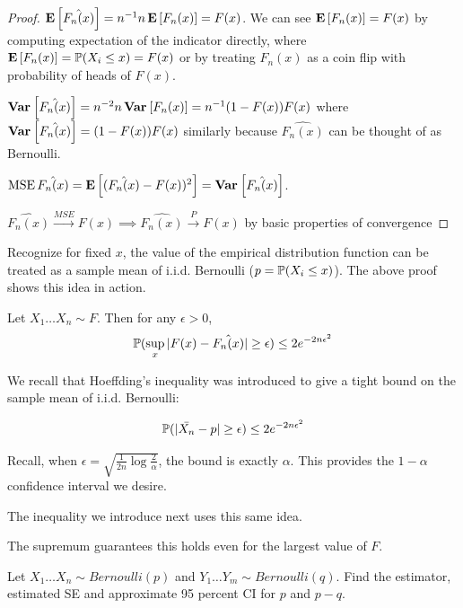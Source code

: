 \documentclass[10pt]{article}
\begin{document}
\begin{proof}
    $\E{\hat{F_n(x)}} = n^{-1}n\E{F_n(x)} = F(x)$. We can see $\E{F_n(x)} =
    F(x)$ by computing expectation of the indicator directly, where $\E{F_n(x)}
    = \P(X_i \leq x) = F(x)$ or by treating $F_n(x)$ as a coin flip with
    probability of heads of $F(x)$.

    $\Var{\hat{F_n(x)}} = n^{-2}n\Var{F_n(x)} = n^{-1}(1-F(x))F(x)$ where
    $\Var{\hat{F_n(x)}} = (1-F(x))F(x)$ similarly because $\hat{F_n(x)}$ can be
    thought of as Bernoulli.

    $\operatorname{MSE}{\hat{F_n(x)}} = \E{(\hat{F_n(x)} - F(x))^2} =
    \Var{\hat{F_n(x)}}$.

    $\hat{F_n(x)} \xrightarrow{MSE} F(x) \implies \hat{F_n(x)} \xrightarrow{P}
    F(x)$ by basic properties of convergence
\end{proof}

Recognize for fixed $x$, the value of the empirical distribution function can be treated as a sample mean
of i.i.d. Bernoulli ($p = \P(X_i \leq x)$). The above proof shows this idea in action.

\begin{definition}
    Let $X_1 \dots X_n \sim F$. Then for any $\epsilon > 0$,
    \[\P(\sup_x|F(x)-\hat{F_n(x)}| \geq \epsilon) \leq 2e^{-2n\epsilon^2}\]
\end{definition}

\begin{note}
We recall that Hoeffding's inequality was introduced to give a tight
bound on the sample mean of i.i.d. Bernoulli:

\[\P(|\bar{X_n} - p| \geq \epsilon) \leq 2e^{-2n\epsilon^2}\]

Recall, when $\epsilon = \sqrt{\frac{1}{2n}\log{\frac{2}{\alpha}}}$, the bound
is exactly $\alpha$. This provides the $1-\alpha$ confidence interval we
desire.

The inequality we introduce next uses this same idea.
\end{note}

\begin{definition}
\end{definition}

The supremum guarantees this holds even for the largest value of $F$.

\begin{exercise}
    Let $X_1 \dots X_n \sim Bernoulli(p)$ and $Y_1 \dots Y_m \sim
    Bernoulli(q)$. Find the estimator, estimated SE and approximate 95 percent CI for $p$ and $p-q$.
\end{exercise}
\end{document}
